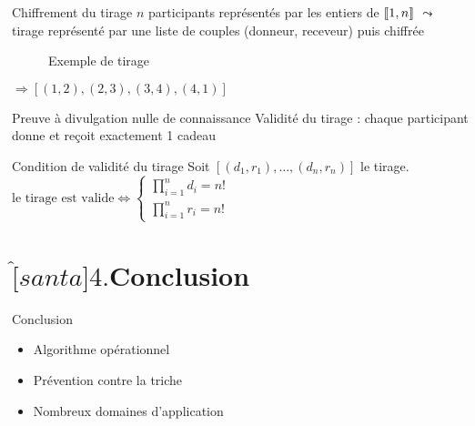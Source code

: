 \documentclass[10pt, compress]{beamer}
\begin{document}
  \begin{frame}{Chiffrement du tirage}
    $n$ participants représentés par les entiers de $\left\llbracket1, n\right\rrbracket$
    \bigbreak
    $\leadsto$ tirage représenté par une liste de couples (donneur, receveur) puis chiffrée
    \bigbreak
    \begin{minipage}[h]{0.48\textwidth}
      \begin{figure}
        \caption{Exemple de tirage}
      \end{figure}
    \end{minipage}
    \begin{minipage}[h]{0.48\textwidth}
      $\Rightarrow [(1, 2), (2, 3), (3, 4), (4, 1)]$
    \end{minipage}
  \end{frame}

  \begin{frame}{Preuve à divulgation nulle de connaissance}
    Validité du tirage : chaque participant donne et reçoit exactement 1 cadeau
    \begin{alertblock}{Condition de validité du tirage}
      Soit $[(d_1, r_1), \ldots, (d_n, r_n)]$ le tirage.
        \(\text{le tirage est valide} \iff
        \begin{cases}
            \displaystyle\prod_{i=1}^nd_i=n ! \\
            \displaystyle\prod_{i=1}^nr_i=n !
        \end{cases}\)
    \end{alertblock}
  \end{frame}

\section{$\hat[santa]{\text{4.}}$\quad Conclusion}

  \begin{frame}{Conclusion}
    \begin{itemize}[<+- | alert@+>]
      \item Algorithme opérationnel
      \item Prévention contre la triche
      \item Nombreux domaines d'application
    \end{itemize}
  \end{frame}
\end{document}
